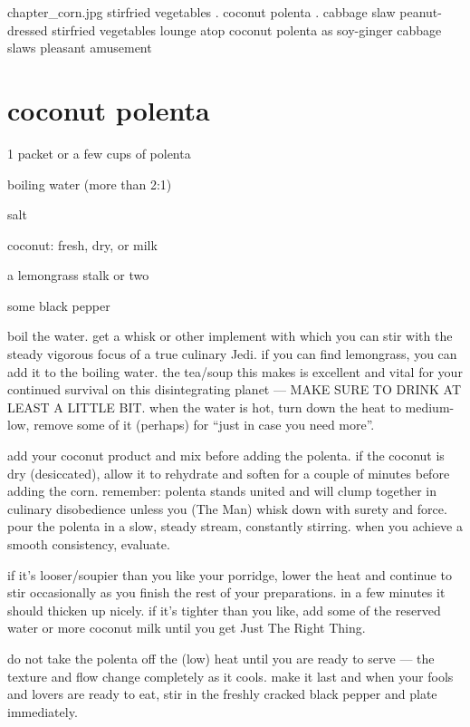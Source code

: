 \mychapter
{chapter_corn.jpg}
{stirfried vegetables . coconut polenta . cabbage slaw}
{peanut-dressed stirfried vegetables lounge atop coconut polenta as
soy-ginger cabbage slaws pleasant amusement}

\section{coconut polenta}

\begin{ingredients}
  \item 1 packet or a few cups of polenta
  \item boiling water (more than 2:1)
  \item salt
  \item coconut: fresh, dry, or milk
  \item a lemongrass stalk or two
  \item some black pepper
\end{ingredients}

boil the water. get a whisk or other implement with which you can stir with 
the steady vigorous focus of a true culinary Jedi. if you can find lemongrass, 
you can add it to the boiling water. the tea/soup this makes is excellent and 
vital for your continued survival on this disintegrating planet --- MAKE SURE 
TO DRINK AT LEAST A LITTLE BIT. when the water is hot, turn down the heat to 
medium-low, remove some of it (\onethird perhaps) for ``just in case you need 
more''.

add your coconut product and mix before adding the polenta. if the coconut is 
dry (desiccated), allow it to rehydrate and soften for a couple of minutes 
before adding the corn. remember: polenta stands united and will clump 
together in culinary disobedience unless you (The Man) whisk down with surety 
and force. pour the polenta in a slow, steady stream, constantly stirring. 
when you achieve a smooth consistency, evaluate.

if it's looser/soupier than you like your porridge, lower the heat and 
continue to stir occasionally as you finish the rest of your preparations. in 
a few minutes it should thicken up nicely. if it's tighter than you like, add 
some of the reserved water or more coconut milk until you get Just The Right 
Thing.

do not take the polenta off the (low) heat until you are ready to serve --- 
the texture and flow change completely as it cools. make it last and when your 
fools and lovers are ready to eat, stir in the freshly cracked black pepper 
and plate immediately.

